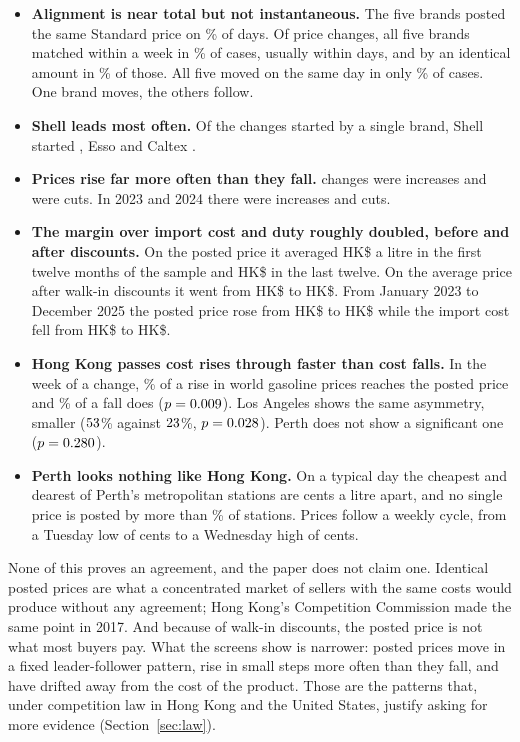 \documentclass[11pt]{article}
\newcommand{\hk}{HK\$}
\begin{document}
\begin{itemize}
\item \textbf{Alignment is near total but not instantaneous.} The five brands posted the same Standard price on \hkShareEqual\% of days. Of \hkEpisodes{} price changes, all five brands matched within a week in \hkShareFullWeek\% of cases, usually within \hkMedianLag{} days, and by an identical amount in \hkShareSameSize\% of those. All five moved on the same day in only \hkShareSameDay\% of cases. One brand moves, the others follow.
\item \textbf{Shell leads most often.} Of the \hkLeadSingle{} changes started by a single brand, Shell started \hkLeadShell, Esso \hkLeadEsso{} and Caltex \hkLeadCaltex.
\item \textbf{Prices rise far more often than they fall.} \hkEpisodesUp{} changes were increases and \hkEpisodesDown{} were cuts. In 2023 and 2024 there were \hkUpTwentyThreeFour{} increases and \hkDownTwentyThreeFour{} cuts.
\item \textbf{The margin over import cost and duty roughly doubled, before and after discounts.} On the posted price it averaged \hk\marginFirst{} a litre in the first twelve months of the sample and \hk\marginLast{} in the last twelve. On the average price after walk-in discounts it went from \hk\netMarginFirst{} to \hk\netMarginLast. From January 2023 to December 2025 the posted price rose from \hk\spanPostedFrom{} to \hk\spanPostedTo{} while the import cost fell from \hk\spanImportFrom{} to \hk\spanImportTo.
\item \textbf{Hong Kong passes cost rises through faster than cost falls.} In the week of a change, \hkRiseZero\% of a rise in world gasoline prices reaches the posted price and \hkFallZero\% of a fall does ($p = 0.009$). Los Angeles shows the same asymmetry, smaller ($53$\% against $23$\%, $p = 0.028$). Perth does not show a significant one ($p = 0.280$).
\item \textbf{Perth looks nothing like Hong Kong.} On a typical day the cheapest and dearest of Perth's \perthStations{} metropolitan stations are \perthRange{} cents a litre apart, and no single price is posted by more than \perthModal\% of stations. Prices follow a weekly cycle, from a Tuesday low of \perthTue{} cents to a Wednesday high of \perthWed{} cents.
\end{itemize}

None of this proves an agreement, and the paper does not claim one. Identical posted prices are what a concentrated market of sellers with the same costs would produce without any agreement; Hong Kong's Competition Commission made the same point in 2017. And because of walk-in discounts, the posted price is not what most buyers pay. What the screens show is narrower: posted prices move in a fixed leader-follower pattern, rise in small steps more often than they fall, and have drifted away from the cost of the product. Those are the patterns that, under competition law in Hong Kong and the United States, justify asking for more evidence (Section~\ref{sec:law}).
\end{document}
